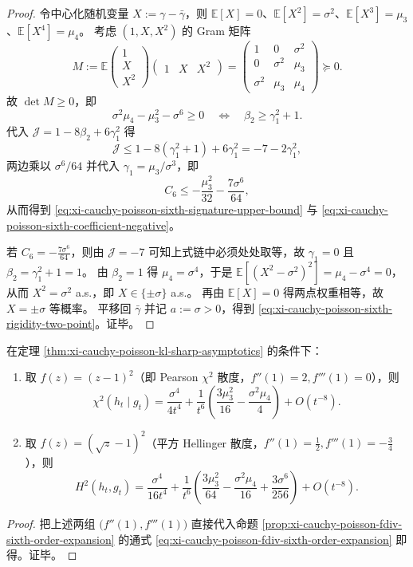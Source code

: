 \begin{proof}
令中心化随机变量 \(X:=\gamma-\bar\gamma\)，则 \(\mathbb E[X]=0\)、\(\mathbb E[X^2]=\sigma^2\)、\(\mathbb E[X^3]=\mu_3\)、\(\mathbb E[X^4]=\mu_4\)。
考虑 \((1,X,X^2)\) 的 Gram 矩阵
\[
M:=\mathbb E
\begin{pmatrix}
1\\ X\\ X^2
\end{pmatrix}
\begin{pmatrix}
1&X&X^2
\end{pmatrix}
=
\begin{pmatrix}
1&0&\sigma^2\\
0&\sigma^2&\mu_3\\
\sigma^2&\mu_3&\mu_4
\end{pmatrix}\succeq 0.
\]
故 \(\det M\ge 0\)，即
\[
\sigma^2\mu_4-\mu_3^2-\sigma^6\ge 0
\quad\Longleftrightarrow\quad
\beta_2\ge \gamma_1^2+1.
\]
代入 \(\mathcal J=1-8\beta_2+6\gamma_1^2\) 得
\[
\mathcal J\le 1-8(\gamma_1^2+1)+6\gamma_1^2=-7-2\gamma_1^2,
\]
两边乘以 \(\sigma^6/64\) 并代入 \(\gamma_1=\mu_3/\sigma^3\)，即
\[
C_6\le -\frac{\mu_3^2}{32}-\frac{7\sigma^6}{64},
\]
从而得到 \eqref{eq:xi-cauchy-poisson-sixth-signature-upper-bound} 与 \eqref{eq:xi-cauchy-poisson-sixth-coefficient-negative}。
\par
若 \(C_6=-\frac{7\sigma^6}{64}\)，则由 \(\mathcal J=-7\) 可知上式链中必须处处取等，故 \(\gamma_1=0\) 且 \(\beta_2=\gamma_1^2+1=1\)。
由 \(\beta_2=1\) 得 \(\mu_4=\sigma^4\)，于是 \(\mathbb E[(X^2-\sigma^2)^2]=\mu_4-\sigma^4=0\)，从而 \(X^2=\sigma^2\) a.s.，即 \(X\in\{\pm\sigma\}\) a.s.。
再由 \(\mathbb E[X]=0\) 得两点权重相等，故 \(X=\pm\sigma\) 等概率。
平移回 \(\bar\gamma\) 并记 \(a:=\sigma>0\)，得到 \eqref{eq:xi-cauchy-poisson-sixth-rigidity-two-point}。证毕。
\end{proof}

\begin{corollary}\label{cor:xi-cauchy-poisson-chi2-hellinger-sixth-order}
在定理 \ref{thm:xi-cauchy-poisson-kl-sharp-asymptotics} 的条件下：
\begin{enumerate}
  \item 取 \(f(z)=(z-1)^2\)（即 Pearson \(\chi^2\) 散度，\(f''(1)=2,f'''(1)=0\)），则
  \[
  \chi^2(h_t\mid g_t)
  =\frac{\sigma^4}{4t^4}
  +\frac{1}{t^6}\left(\frac{3\mu_3^2}{16}-\frac{\sigma^2\mu_4}{4}\right)
  +O(t^{-8}).
  \]
  \item 取 \(f(z)=(\sqrt z-1)^2\)（平方 Hellinger 散度，\(f''(1)=\frac12,f'''(1)=-\frac34\)），则
  \[
  H^2(h_t,g_t)
  =\frac{\sigma^4}{16t^4}
  +\frac{1}{t^6}\left(
  \frac{3\mu_3^2}{64}
  -\frac{\sigma^2\mu_4}{16}
  +\frac{3\sigma^6}{256}\right)
  +O(t^{-8}).
  \]
\end{enumerate}
\end{corollary}
\begin{proof}
把上述两组 \(\bigl(f''(1),f'''(1)\bigr)\) 直接代入命题
\ref{prop:xi-cauchy-poisson-fdiv-sixth-order-expansion}
的通式 \eqref{eq:xi-cauchy-poisson-fdiv-sixth-order-expansion} 即得。证毕。
\end{proof}

